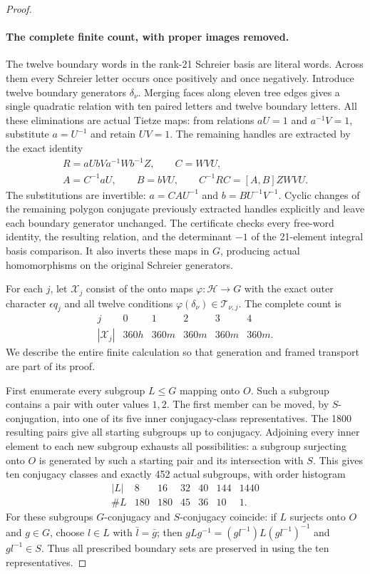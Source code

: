 \begin{proof}
\paragraph{The complete finite count, with proper images removed.}
The twelve boundary words in the rank-21 Schreier basis are
literal words.  Across them every Schreier letter occurs once
positively and once negatively.  Introduce twelve boundary
generators \(\delta_\nu\).  Merging faces along eleven tree
edges gives a single quadratic relation with ten paired
letters and twelve boundary letters.  All these eliminations
are actual Tietze maps: from relations \(aU=1\) and
\(a^{-1}V=1\), substitute \(a=U^{-1}\) and retain \(UV=1\).
The remaining handles are extracted by the exact identity
\[
 \begin{gathered}
 R=aUbVa^{-1}Wb^{-1}Z,\qquad C=WVU,\\
 A=C^{-1}aU,\qquad B=bVU,\qquad
 C^{-1}RC=[A,B]ZWVU.
 \end{gathered}
 \tag{D.36.23}
\]
The substitutions are invertible:
\(a=CAU^{-1}\) and \(b=BU^{-1}V^{-1}\).
Cyclic changes of the remaining polygon conjugate previously
extracted handles explicitly and leave each boundary generator
unchanged.  The certificate checks every free-word identity,
the resulting relation, and the determinant \(-1\) of the
21-element integral basis comparison.  It also inverts these
maps in \(G\), producing actual homomorphisms on the original
Schreier generators.

For each \(j\), let \(\mathscr X_j\) consist of the onto maps
\(\varphi:\mathcal H\to G\) with the exact outer character
\(\epsilon q_j\) and all twelve conditions
\(\varphi(\delta_\nu)\in\mathcal T_{\nu,j}\).
The complete count is
\[
 \begin{array}{c|ccccc}
 j&0&1&2&3&4\\\hline
 |\mathscr X_j|&360h&360m&360m&360m&360m .
 \end{array}
 \tag{D.36.24}
\]
We describe the entire finite calculation so that generation
and framed transport are part of its proof.

First enumerate every subgroup \(L\leq G\) mapping onto \(O\).
Such a subgroup contains a pair with outer values \(1,2\).
The first member can be moved, by \(S\)-conjugation, into one
of its five inner conjugacy-class representatives.  The 1800
resulting pairs give all starting subgroups up to conjugacy.
Adjoining every inner element to each new subgroup exhausts
all possibilities: a subgroup surjecting onto \(O\) is
generated by such a starting pair and its intersection with
\(S\).  This gives ten conjugacy classes and exactly 452
actual subgroups, with order histogram
\[
 \begin{array}{c|rrrrrr}
 |L|&8&16&32&40&144&1440\\\hline
 \#L&180&180&45&36&10&1.
 \end{array}
 \tag{D.36.25}
\]
For these subgroups \(G\)-conjugacy and \(S\)-conjugacy coincide:
if \(L\) surjects onto \(O\) and \(g\in G\), choose
\(l\in L\) with \(\bar l=\bar g\); then
\(gLg^{-1}=(gl^{-1})L(gl^{-1})^{-1}\) and \(gl^{-1}\in S\).
Thus all prescribed boundary sets are preserved in using the
ten representatives.


\end{proof}

